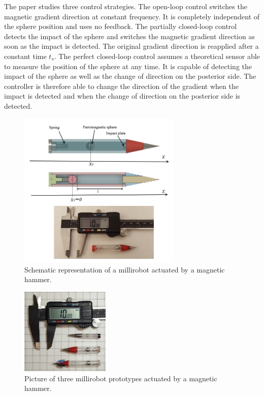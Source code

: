 \documentclass[letterpaper, 10 pt, conference]{ieeeconf}  %
\begin{document}
The paper studies three control strategies. The open-loop control switches the magnetic gradient direction at constant frequency. It is completely independent of the sphere position and uses no feedback. The partially closed-loop control detects the impact of the sphere and switches the magnetic gradient direction as soon as the impact is detected. The original gradient direction is reapplied after a constant time $t_s$. The perfect closed-loop control assumes a theoretical sensor able to measure the position of the sphere at any time. It is capable of detecting the impact of the sphere as well as the change of direction on the posterior side. The controller is therefore able to change the direction of the gradient when the impact is detected and when the change of direction on the posterior side is detected.\par


\begin{figure}\centering
  \includegraphics[width=220pt]{figure1-2.png}
  \caption{Schematic representation of a millirobot actuated by a magnetic hammer.}
  \label{millirobot}
\end{figure}

\begin{figure}
\begin{centering}
  \includegraphics[width=120pt]{robots_prototypes.jpg}
  \caption{Picture of three millirobot prototypes actuated by a magnetic hammer.}
  \label{prototypes}
\end{centering}
\end{figure}
\end{document}
